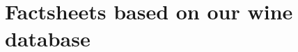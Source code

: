 \documentclass{article}
\begin{document}
\begin{figure}[H]
    \vspace*{-0.3cm}
\end{figure}

\newpage

\section{Factsheets based on our wine database }

\newpage

 
 \Fields{\Name\PictureID\Year\Rating\PriceRange\Winery\WineryDescription\Country\Region\Category\LighttoBold\SmoothtoTannic\DrytoSweet\SofttoAcidic\Catone\Cattwo\Grapes\WineStyle\WineStyleDescription\Alcohol\MainImpressionsA\MainImpressionsB\MainImpressionsC\FoodPairing\Notes\Color} 
 
\end{document}

